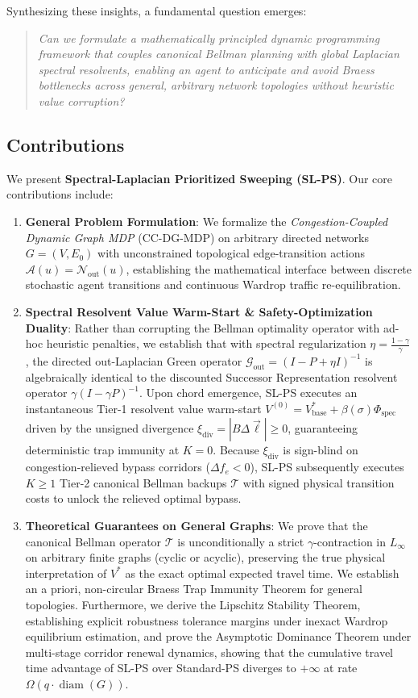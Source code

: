 \documentclass[11pt,a4paper]{article}
\begin{document}
Synthesizing these insights, a fundamental question emerges:
\begin{quote}
\textit{Can we formulate a mathematically principled dynamic programming framework that couples canonical Bellman planning with global Laplacian spectral resolvents, enabling an agent to anticipate and avoid Braess bottlenecks across general, arbitrary network topologies without heuristic value corruption?}
\end{quote}

\subsection{Contributions}
We present \textbf{Spectral-Laplacian Prioritized Sweeping (SL-PS)}. Our core contributions include:
\begin{enumerate}
    \item \textbf{General Problem Formulation}: We formalize the \textit{Congestion-Coupled Dynamic Graph MDP} (CC-DG-MDP) on arbitrary directed networks $G = (V, E_0)$ with unconstrained topological edge-transition actions $\mathcal{A}(u) = \mathcal{N}_{\text{out}}(u)$, establishing the mathematical interface between discrete stochastic agent transitions and continuous Wardrop traffic re-equilibration.
    \item \textbf{Spectral Resolvent Value Warm-Start \& Safety-Optimization Duality}: Rather than corrupting the Bellman optimality operator with ad-hoc heuristic penalties, we establish that with spectral regularization $\eta = \frac{1-\gamma}{\gamma}$, the directed out-Laplacian Green operator $\mathcal{G}_{\text{out}} = (I - P + \eta I)^{-1}$ is algebraically identical to the discounted Successor Representation resolvent operator $\gamma (I - \gamma P)^{-1}$. Upon chord emergence, SL-PS executes an instantaneous Tier-1 resolvent value warm-start $V^{(0)} = V_{\text{base}}^* + \beta(\sigma) \Phi_{\text{spec}}$ driven by the unsigned divergence $\xi_{\text{div}} = |B\Delta\vec{\ell}| \ge 0$, guaranteeing deterministic trap immunity at $K=0$. Because $\xi_{\text{div}}$ is sign-blind on congestion-relieved bypass corridors ($\Delta f_e < 0$), SL-PS subsequently executes $K \ge 1$ Tier-2 canonical Bellman backups $\mathcal{T}$ with signed physical transition costs to unlock the relieved optimal bypass.
    \item \textbf{Theoretical Guarantees on General Graphs}: We prove that the canonical Bellman operator $\mathcal{T}$ is unconditionally a strict $\gamma$-contraction in $L_\infty$ on arbitrary finite graphs (cyclic or acyclic), preserving the true physical interpretation of $V^*$ as the exact optimal expected travel time. We establish an a priori, non-circular Braess Trap Immunity Theorem for general topologies. Furthermore, we derive the Lipschitz Stability Theorem, establishing explicit robustness tolerance margins under inexact Wardrop equilibrium estimation, and prove the Asymptotic Dominance Theorem under multi-stage corridor renewal dynamics, showing that the cumulative travel time advantage of SL-PS over Standard-PS diverges to $+\infty$ at rate $\Omega(q \cdot \operatorname{diam}(G))$.

\end{enumerate}
\end{document}
